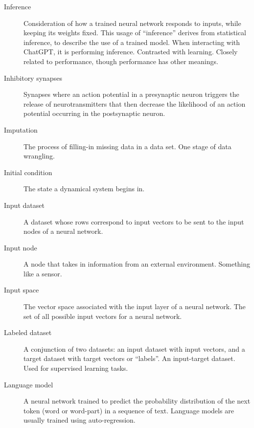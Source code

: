 \begin{description}
\item[Inference] Consideration of how a trained neural network responds to inputs, while keeping its weights fixed. This usage of ``inference'' derives from statistical inference, to describe the use of a trained model. When interacting with ChatGPT, it is performing inference. Contrasted with learning.  Closely related to performance, though performance has other meanings.

\item[Inhibitory synapses] Synapses where an action potential in a presynaptic neuron triggers the release of neurotransmitters that then decrease the likelihood of an action potential occurring in the postsynaptic neuron.

\item[Imputation] The process of filling-in missing data in a data set. One stage of data wrangling.

\item[Initial condition] The state a dynamical system begins in.

\item[Input dataset] A dataset whose rows correspond to input vectors to be sent to the input nodes of a neural network.

\item[Input node] A node that takes in information from an external environment. Something like a sensor.

\item[Input space] The vector space associated with the input layer of a neural network. The set of all possible input vectors for a neural network.





\item[Labeled dataset] A conjunction of two datasets: an input dataset with input vectors, and a target dataset with target vectors or ``labels''. An input-target dataset. Used for supervised learning tasks.  

\item[Language model] A neural network trained to predict the probability distribution of the next token (word or word-part) in a sequence of text. Language models are usually trained using auto-regression.


\end{description}
